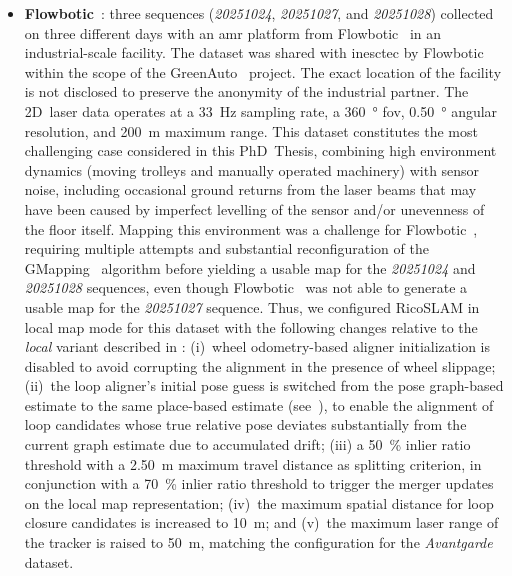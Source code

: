 \begin{itemize}
\item \textbf{Flowbotic}~\cite{flowbotic}: three sequences (\emph{20251024},
      \emph{20251027}, and \emph{20251028}) collected on three different
      days with an \gls{amr} platform from Flowbotic~\cite{flowbotic} in
      an industrial-scale facility. The dataset was shared with
      \gls{inesctec} by Flowbotic~\cite{flowbotic} within the scope of
      the GreenAuto~\cite{greenauto} project. The exact location of the facility
      is not disclosed to preserve the anonymity of the industrial partner.
      The 2D~laser data operates at a \SI{33}{\hertz} sampling rate, a \SI{360}{\degree} \gls{fov},
      \SI{0.50}{\degree} angular resolution, and \SI{200}{\metre} maximum range.
      This dataset constitutes the most challenging case considered in
      this PhD~Thesis, combining high environment dynamics
      (moving trolleys and manually operated machinery) with sensor noise,
      including occasional ground returns from the laser
      beams that may have been caused by imperfect levelling of the
      sensor and/or unevenness of the floor itself.
      Mapping this environment was a challenge for Flowbotic~\cite{flowbotic},
      requiring multiple attempts and substantial reconfiguration of the
      GMapping~\cite{grisetti:tro:2007} algorithm before yielding a usable map
      for the \emph{20251024} and \emph{20251028} sequences, even though
      Flowbotic~\cite{flowbotic} was not able to generate a usable map for the
      \emph{20251027} sequence.
      Thus, we configured RicoSLAM in local map mode for this dataset with the
      following changes relative to the \emph{local} variant described in
      :
      (i)~wheel odometry-based aligner initialization is disabled to
      avoid corrupting the alignment in the presence of wheel slippage;
      (ii)~the loop aligner's initial pose guess is switched from the
      pose graph-based estimate to the same place-based estimate
      (see~), to enable the
      alignment of loop candidates whose true relative pose deviates
      substantially from the current graph estimate due to accumulated drift;
      (iii) a \SI{50}{\percent} inlier ratio threshold with a \SI{2.50}{\metre}
      maximum travel distance as splitting criterion, in conjunction with a
      \SI{70}{\percent} inlier ratio threshold to trigger the merger updates
      on the local map representation;
      (iv)~the maximum spatial distance for loop closure candidates is
      increased to \SI{10}{\metre}; and
      (v)~the maximum laser range of the tracker is raised to \SI{50}{\metre},
      matching the configuration for the \emph{Avantgarde} dataset.


\end{itemize}
